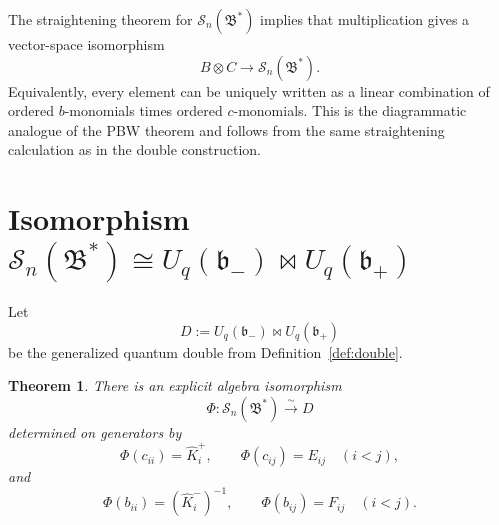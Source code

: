 \documentclass[11pt]{article}
\newcommand{\bcS}{\mathcal S}
\newcommand{\fB}{\mathfrak B}
\newcommand{\fb}{\mathfrak b}
\newcommand{\bipr}{\mathbin{\bowtie}}
\newcommand{\Khat}{\widehat K}
\newtheorem{theorem}{Theorem}
\begin{document}
The straightening theorem for \(\bcS_n(\fB^*)\) implies that multiplication gives a vector-space isomorphism
\begin{equation}\label{eq:S-vector-space}
B\otimes C\longrightarrow \bcS_n(\fB^*).
\end{equation}
Equivalently, every element can be uniquely written as a linear combination of ordered \(b\)-monomials times ordered \(c\)-monomials.  This is the diagrammatic analogue of the PBW theorem and follows from the same straightening calculation as in the double construction.

\section{Isomorphism \(\bcS_n(\fB^*)\cong U_q(\fb_-)\bipr U_q(\fb_+)\)}

Let
\[
D:=U_q(\fb_-)\bipr U_q(\fb_+)
\]
be the generalized quantum double from Definition~\ref{def:double}.

\begin{theorem}\label{thm:main-isom}
There is an explicit algebra isomorphism
\[
\Phi:\bcS_n(\fB^*)\xrightarrow{\sim}D
\]
determined on generators by
\begin{equation}\label{eq:Phi}
\Phi(c_{ii})=\Khat_i^+,\qquad
\Phi(c_{ij})=E_{ij}\quad(i<j),
\end{equation}
and
\begin{equation}\label{eq:Phi-b}
\Phi(b_{ii})=(\Khat_i^-)^{-1},\qquad
\Phi(b_{ij})=F_{ij}\quad(i<j).
\end{equation}
\end{theorem}
\end{document}
